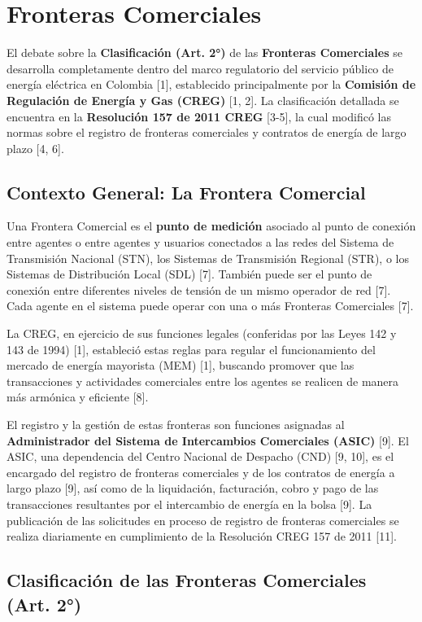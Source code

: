\documentclass[a5paper]{book}%
\begin{document}
\section{Fronteras Comerciales}

El debate sobre la \textbf{Clasificación (Art. 2°)} de las \textbf{Fronteras Comerciales} se desarrolla completamente dentro del marco regulatorio del servicio público de energía eléctrica en Colombia [1], establecido principalmente por la \textbf{Comisión de Regulación de Energía y Gas (CREG)} [1, 2]. La clasificación detallada se encuentra en la \textbf{Resolución 157 de 2011 CREG} [3-5], la cual modificó las normas sobre el registro de fronteras comerciales y contratos de energía de largo plazo [4, 6].

\subsection{Contexto General: La Frontera Comercial}

Una Frontera Comercial es el \textbf{punto de medición} asociado al punto de conexión entre agentes o entre agentes y usuarios conectados a las redes del Sistema de Transmisión Nacional (STN), los Sistemas de Transmisión Regional (STR), o los Sistemas de Distribución Local (SDL) [7]. También puede ser el punto de conexión entre diferentes niveles de tensión de un mismo operador de red [7]. Cada agente en el sistema puede operar con una o más Fronteras Comerciales [7].

La CREG, en ejercicio de sus funciones legales (conferidas por las Leyes 142 y 143 de 1994) [1], estableció estas reglas para regular el funcionamiento del mercado de energía mayorista (MEM) [1], buscando promover que las transacciones y actividades comerciales entre los agentes se realicen de manera más armónica y eficiente [8].

El registro y la gestión de estas fronteras son funciones asignadas al \textbf{Administrador del Sistema de Intercambios Comerciales (ASIC)} [9]. El ASIC, una dependencia del Centro Nacional de Despacho (CND) [9, 10], es el encargado del registro de fronteras comerciales y de los contratos de energía a largo plazo [9], así como de la liquidación, facturación, cobro y pago de las transacciones resultantes por el intercambio de energía en la bolsa [9]. La publicación de las solicitudes en proceso de registro de fronteras comerciales se realiza diariamente en cumplimiento de la Resolución CREG 157 de 2011 [11].

\subsection{Clasificación de las Fronteras Comerciales (Art. 2°)}
\end{document}
